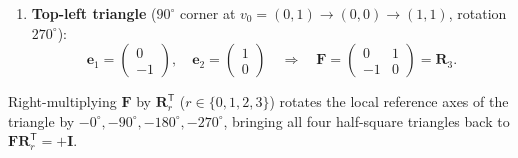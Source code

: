 \documentclass[11pt,a4paper]{article}
\newcommand{\T}{^{\mathsf T}}
\begin{document}
\begin{enumerate}[noitemsep]
  \begin{equation}
    \mathbf{e}_1 = \begin{pmatrix} -1 \\ 0 \end{pmatrix}, \quad
    \mathbf{e}_2 = \begin{pmatrix} 0 \\ -1 \end{pmatrix}
    \quad\Longrightarrow\quad
    \mathbf{F} = \begin{pmatrix} -1 & 0 \\ 0 & -1 \end{pmatrix} = \mathbf{R}_2 = -\mathbf{I}.
  \end{equation}
  \item \textbf{Top-left triangle} ($90^\circ$ corner at $v_0=(0,1) \to (0,0) \to (1,1)$, rotation $270^\circ$):
  \begin{equation}
    \mathbf{e}_1 = \begin{pmatrix} 0 \\ -1 \end{pmatrix}, \quad
    \mathbf{e}_2 = \begin{pmatrix} 1 \\ 0 \end{pmatrix}
    \quad\Longrightarrow\quad
    \mathbf{F} = \begin{pmatrix} 0 & 1 \\ -1 & 0 \end{pmatrix} = \mathbf{R}_3.
  \end{equation}
\end{enumerate}
Right-multiplying $\mathbf{F}$ by $\mathbf{R}_r\T$ ($r \in \{0,1,2,3\}$) rotates the local reference axes of the triangle by $-0^\circ, -90^\circ, -180^\circ, -270^\circ$, bringing all four half-square triangles back to $\mathbf{F}\mathbf{R}_r\T = +\mathbf{I}$.
\end{document}
